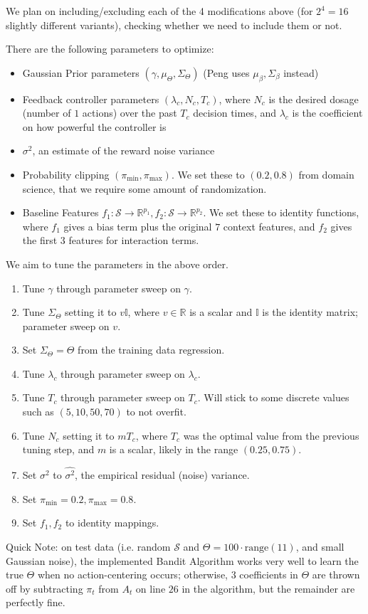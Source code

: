 We plan on including/excluding each of the 4 modifications above (for $2^4 = 16$ slightly different variants), checking whether we need to include them or not.


There are the following parameters to optimize:
\begin{itemize}
	\item Gaussian Prior parameters $(\gamma, \mu_\Theta, \Sigma_\Theta)$ (Peng uses $\mu_\beta, \Sigma_\beta$ instead)
	\item Feedback controller parameters $(\lambda_c, N_c, T_c)$, where $N_c$ is the desired dosage (number of $1$ actions) over the past $T_c$ decision times, and $\lambda_c$ is the coefficient on how powerful the controller is
	\item $\sigma^2$, an estimate of the reward noise variance
	\item Probability clipping $(\pi_{\text{min}}, \pi_{\text{max}})$.  We set these to $(0.2, 0.8)$ from domain science, that we require some amount of randomization.
	\item Baseline Features $f_1: \mathcal{S} \to \mathbb{R}^{p_1}, f_2:\mathcal{S} \to \mathbb{R}^{p_2}$.  We set these to identity functions, where $f_1$ gives a bias term plus the original $7$ context features, and $f_2$ gives the first $3$ features for interaction terms.
\end{itemize}

We aim to tune the parameters in the above order.  
\begin{enumerate}
	\item Tune $\gamma$ through parameter sweep on $\gamma$.
	\item Tune $\Sigma_\Theta$ setting it to $v \mathbb{I}$, where $v \in \mathbb{R}$ is a scalar and $\mathbb{I}$ is the identity matrix; parameter sweep on $v$.
	\item Set $\Sigma_\Theta = \Theta$ from the training data regression.
	\item Tune $\lambda_c$ through parameter sweep on $\lambda_c$.
	\item Tune $T_c$ through parameter sweep on $T_c$.  Will stick to some discrete values such as $(5,10,50,70)$ to not overfit.  
	\item Tune $N_c$ setting it to $m T_c$, where $T_c$ was the optimal value from the previous tuning step, and $m$ is a scalar, likely in the range $(0.25, 0.75)$.
	\item Set $\sigma^2$ to $\hat{\sigma^2}$, the empirical residual (noise) variance.
	\item Set $\pi_{\text{min}} = 0.2, \pi_{\text{max}} = 0.8$.
	\item Set $f_1, f_2$ to identity mappings.
\end{enumerate}

Quick Note: on test data (i.e. random $\mathcal{S}$ and $\Theta = 100\cdot\text{range}(11)$, and small Gaussian noise), the implemented Bandit Algorithm works very well to learn the true $\Theta$ when no action-centering occurs; otherwise, $3$ coefficients in $\Theta$ are thrown off by subtracting $\pi_t$ from $A_t$ on line $26$ in the algorithm, but the remainder are perfectly fine.